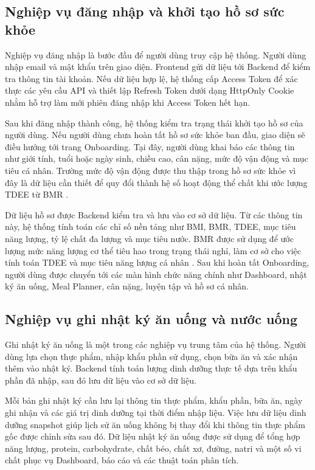 \documentclass[12pt, a4paper]{report}
\begin{document}
\subsection{Nghiệp vụ đăng nhập và khởi tạo hồ sơ sức khỏe}Nghiệp vụ đăng nhập là bước đầu để người dùng truy cập hệ thống. Người dùng nhập email và mật khẩu trên giao diện. Frontend gửi dữ liệu tới Backend để kiểm tra thông tin tài khoản. Nếu dữ liệu hợp lệ, hệ thống cấp Access Token để xác thực các yêu cầu API và thiết lập Refresh Token dưới dạng HttpOnly Cookie nhằm hỗ trợ làm mới phiên đăng nhập khi Access Token hết hạn.

Sau khi đăng nhập thành công, hệ thống kiểm tra trạng thái khởi tạo hồ sơ của người dùng. Nếu người dùng chưa hoàn tất hồ sơ sức khỏe ban đầu, giao diện sẽ điều hướng tới trang Onboarding. Tại đây, người dùng khai báo các thông tin như giới tính, tuổi hoặc ngày sinh, chiều cao, cân nặng, mức độ vận động và mục tiêu cá nhân. Trường mức độ vận động được thu thập trong hồ sơ sức khỏe vì đây là dữ liệu cần thiết để quy đổi thành hệ số hoạt động thể chất khi ước lượng TDEE từ BMR \cite{fao_who_unu_2001}.

Dữ liệu hồ sơ được Backend kiểm tra và lưu vào cơ sở dữ liệu. Từ các thông tin này, hệ thống tính toán các chỉ số nền tảng như BMI, BMR, TDEE, mục tiêu năng lượng, tỷ lệ chất đa lượng và mục tiêu nước. BMR được sử dụng để ước lượng mức năng lượng cơ thể tiêu hao trong trạng thái nghỉ, làm cơ sở cho việc tính toán TDEE và mục tiêu năng lượng cá nhân \cite{mifflin1990}. Sau khi hoàn tất Onboarding, người dùng được chuyển tới các màn hình chức năng chính như Dashboard, nhật ký ăn uống, Meal Planner, cân nặng, luyện tập và hồ sơ cá nhân.

\subsection{Nghiệp vụ ghi nhật ký ăn uống và nước uống}Ghi nhật ký ăn uống là một trong các nghiệp vụ trung tâm của hệ thống. Người dùng lựa chọn thực phẩm, nhập khẩu phần sử dụng, chọn bữa ăn và xác nhận thêm vào nhật ký. Backend tính toán lượng dinh dưỡng thực tế dựa trên khẩu phần đã nhập, sau đó lưu dữ liệu vào cơ sở dữ liệu.

Mỗi bản ghi nhật ký cần lưu lại thông tin thực phẩm, khẩu phần, bữa ăn, ngày ghi nhận và các giá trị dinh dưỡng tại thời điểm nhập liệu. Việc lưu dữ liệu dinh dưỡng snapshot giúp lịch sử ăn uống không bị thay đổi khi thông tin thực phẩm gốc được chỉnh sửa sau đó. Dữ liệu nhật ký ăn uống được sử dụng để tổng hợp năng lượng, protein, carbohydrate, chất béo, chất xơ, đường, natri và một số vi chất phục vụ Dashboard, báo cáo và các thuật toán phân tích.
\end{document}
